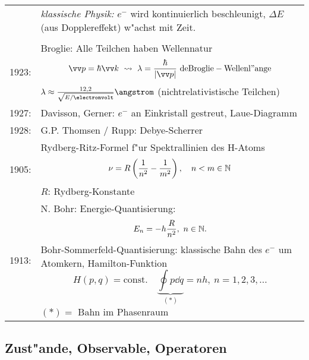 \documentclass[a4paper]{scrartcl}
\begin{document}
\begin{tabular}{l p{400pt}}
& \emph{klassische Physik:} $e^-$ wird kontinuierlich beschleunigt, $\Delta E$ (aus Dopplereffekt) w"achst mit Zeit. \\
\\
1923: & Broglie: Alle Teilchen haben Wellennatur
$$\vv p = \hbar \vv k \ \leadsto \  \lambda = \frac{\hbar}{ \vert \vv p \vert } \ \mathrm{ deBroglie-Wellenl"ange}$$
$\lambda \approx \frac{12,2}{\sqrt{ E/ \electronvolt}} \angstrom$ (nichtrelativistische Teilchen)
\\
1927: & Davisson, Gerner: $e^-$ an Einkristall gestreut, Laue-Diagramm \\
1928: & G.P. Thomsen / Rupp: Debye-Scherrer \\
1905: & Rydberg-Ritz-Formel f"ur Spektrallinien des H-Atoms
$$\nu = R\left( \frac1{n^2} - \frac1{m^2} \right), \quad n<m \in \mathbb{N}$$
$R$: Rydberg-Konstante \\
1913: & N. Bohr: Energie-Quantisierung: $$E_n = - h \frac{R}{n^2}, \ n \in \mathbb{N}.$$
Bohr-Sommerfeld-Quantisierung: klassische Bahn des $e^-$ um Atomkern, Hamilton-Funktion 
$$H(p,q) = \mathrm{const.} \quad \underbrace{\oint p \dd q}_{(*)} = nh, \ n = 1,2,3, \ldots$$
$(*) = $ Bahn im Phasenraum
\end{tabular}

\subsection{Zust"ande, Observable, Operatoren}
\end{document}
